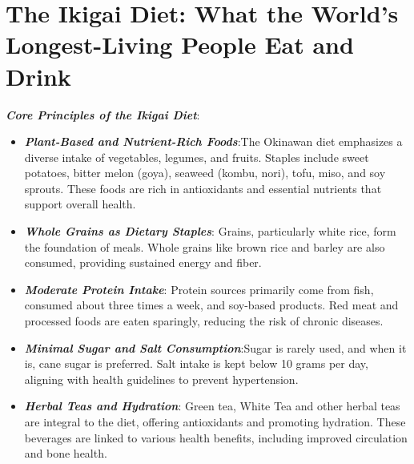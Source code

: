 \section*{The Ikigai Diet: What the World's Longest-Living People Eat and Drink}
\textbf{\textit{Core Principles of the Ikigai Diet}}:
\begin{itemize}
    \item \textbf{\textit{Plant-Based and Nutrient-Rich Foods}}:The Okinawan diet emphasizes a diverse intake of vegetables, legumes, and fruits. Staples include sweet potatoes, bitter melon (goya), seaweed (kombu, nori), tofu, miso, and soy sprouts. These foods are rich in antioxidants and essential nutrients that support overall health.
    \item \textbf{\textit{Whole Grains as Dietary Staples}}: Grains, particularly white rice, form the foundation of meals. Whole grains like brown rice and barley are also consumed, providing sustained energy and fiber.
    \item \textbf{\textit{Moderate Protein Intake}}: Protein sources primarily come from fish, consumed about three times a week, and soy-based products. Red meat and processed foods are eaten sparingly, reducing the risk of chronic diseases.
    \item \textbf{\textit{Minimal Sugar and Salt Consumption}}:Sugar is rarely used, and when it is, cane sugar is preferred. Salt intake is kept below 10 grams per day, aligning with health guidelines to prevent hypertension.
    \item \textbf{\textit{Herbal Teas and Hydration}}: Green tea, White Tea and other herbal teas are integral to the diet, offering antioxidants and promoting hydration. These beverages are linked to various health benefits, including improved circulation and bone health.
\end{itemize}
